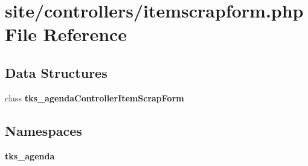 \section{site/controllers/itemscrapform.php File Reference}
\label{controllers_2itemscrapform_8php}
\subsection*{Data Structures}
\begin{DoxyCompactItemize}
\item 
class \textbf{ tks\+\_\+agenda\+Controller\+Item\+Scrap\+Form}
\end{DoxyCompactItemize}
\subsection*{Namespaces}
\begin{DoxyCompactItemize}
\item 
 \textbf{ tks\+\_\+agenda}
\end{DoxyCompactItemize}
